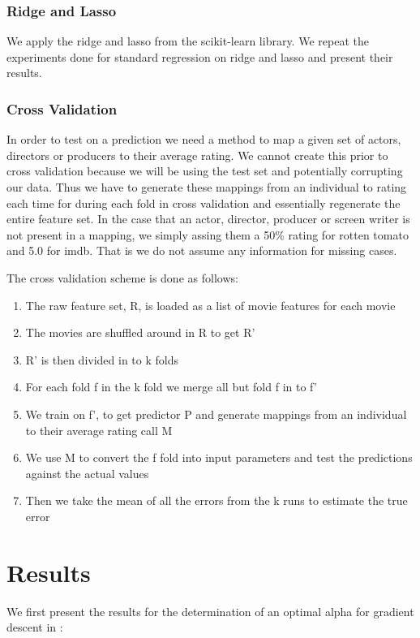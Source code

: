 \documentclass[conference]{IEEEtran}
\begin{document}
\subsubsection{Ridge and Lasso}
We apply the ridge and lasso from the scikit-learn library. We repeat the experiments
done for standard regression on ridge and lasso and present their results.

\subsubsection{Cross Validation}
In order to test on a prediction we need a method to map a given set of actors, directors or producers to
their average rating. We cannot create this prior to cross validation because we will be using the test set 
and potentially corrupting our data. Thus we have to generate these mappings from an individual to rating 
each time for during each fold in cross validation and essentially regenerate the entire feature set. 
In the case that an actor, director, producer or screen writer is not present in a mapping, we simply assing 
them a 50\% rating for rotten tomato and 5.0 for imdb. That is we do not assume any information for missing cases.

The cross validation scheme is done as follows: 
\begin{enumerate}
\item The raw feature set, R, is loaded as a list of movie features for each movie
\item The movies are shuffled around in R to get R' 
\item R' is then divided in to k folds 
\item For each fold f in the k fold we merge all but fold f in to f' 
\item We train on f', to get predictor P and generate mappings from an individual to their average rating call M 
\item We use M to convert the f fold into input parameters and test the predictions against the actual values 
\item Then we take the mean of all the errors from the k runs to estimate the true error 
\end{enumerate}


\section{Results}
We first present the results for the determination of an optimal alpha for gradient descent in : 
\end{document}
